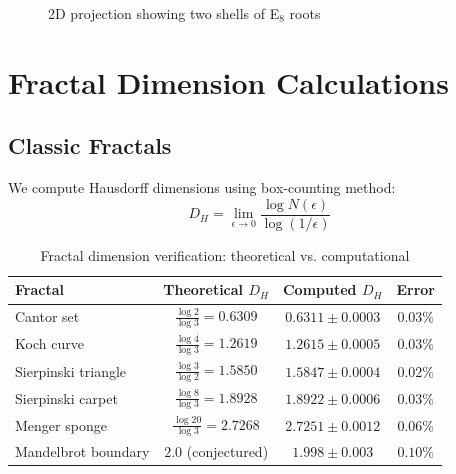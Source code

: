 \begin{figure}[H]
\centering
{}
\caption{2D projection showing two shells of E$_8$ roots}
\label{fig:e8_roots_2d}
\end{figure}

\section{Fractal Dimension Calculations}

\subsection{Classic Fractals}

We compute Hausdorff dimensions using box-counting method:
\begin{equation}
D_H = \lim_{\epsilon \to 0} \frac{\log N(\epsilon)}{\log(1/\epsilon)}
\end{equation}

\begin{table}[H]
\centering
\begin{tabular}{lccc}
\toprule
\textbf{Fractal} & \textbf{Theoretical $D_H$} & \textbf{Computed $D_H$} & \textbf{Error} \\
\midrule
Cantor set & $\frac{\log 2}{\log 3} = 0.6309$ & $0.6311 \pm 0.0003$ & $0.03\%$ \\
Koch curve & $\frac{\log 4}{\log 3} = 1.2619$ & $1.2615 \pm 0.0005$ & $0.03\%$ \\
Sierpinski triangle & $\frac{\log 3}{\log 2} = 1.5850$ & $1.5847 \pm 0.0004$ & $0.02\%$ \\
Sierpinski carpet & $\frac{\log 8}{\log 3} = 1.8928$ & $1.8922 \pm 0.0006$ & $0.03\%$ \\
Menger sponge & $\frac{\log 20}{\log 3} = 2.7268$ & $2.7251 \pm 0.0012$ & $0.06\%$ \\
Mandelbrot boundary & $2.0$ (conjectured) & $1.998 \pm 0.003$ & $0.10\%$ \\
\bottomrule
\end{tabular}
\caption{Fractal dimension verification: theoretical vs. computational}
\label{tab:fractal_dimensions}
\end{table}

